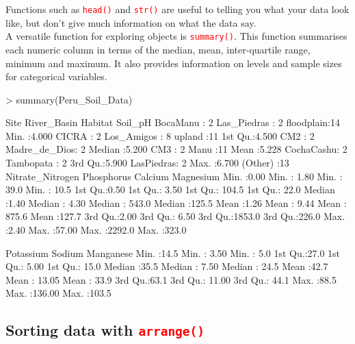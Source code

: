 \documentclass[a4paper,12pt]{article}
\newcommand\code[1]{\textcolor{red}{\texttt{#1}}}
\begin{document}
Functions such as \code{head()} and \code{str()} are useful to telling you what your data look like, but don't give much information on what the data say.\\

A versatile function for exploring objects is \code{summary()}. This function summarises each numeric column in terms of the median, mean, inter-quartile range, minimum and maximum. It also provides information on levels and sample sizes for categorical variables. 

\begin{shaded}
\begin{Schunk}
\begin{Sinput}
> summary(Peru_Soil_Data)
\end{Sinput}
\begin{Soutput}
         Site           River_Basin       Habitat      Soil_pH     
 BocaManu  : 2   Las_Piedras  : 2   floodplain:14   Min.   :4.000  
 CICRA     : 2   Los_Amigos   : 8   upland    :11   1st Qu.:4.500  
 CM2       : 2   Madre_de_Dios: 2                   Median :5.200  
 CM3       : 2   Manu         :11                   Mean   :5.228  
 CochaCashu: 2   Tambopata    : 2                   3rd Qu.:5.900  
 LasPiedras: 2                                      Max.   :6.700  
 (Other)   :13                                                     
 Nitrate_Nitrogen   Phosphorus       Calcium         Magnesium    
 Min.   :0.00     Min.   : 1.80   Min.   :  39.0   Min.   : 10.5  
 1st Qu.:0.50     1st Qu.: 3.50   1st Qu.: 104.5   1st Qu.: 22.0  
 Median :1.40     Median : 4.30   Median : 543.0   Median :125.5  
 Mean   :1.26     Mean   : 9.44   Mean   : 875.6   Mean   :127.7  
 3rd Qu.:2.00     3rd Qu.: 6.50   3rd Qu.:1853.0   3rd Qu.:226.0  
 Max.   :2.40     Max.   :57.00   Max.   :2292.0   Max.   :323.0  
                                                                  
   Potassium        Sodium         Manganese    
 Min.   :14.5   Min.   :  3.50   Min.   :  5.0  
 1st Qu.:27.0   1st Qu.:  5.00   1st Qu.: 15.0  
 Median :35.5   Median :  7.50   Median : 24.5  
 Mean   :42.7   Mean   : 13.05   Mean   : 33.9  
 3rd Qu.:63.1   3rd Qu.: 11.00   3rd Qu.: 44.1  
 Max.   :88.5   Max.   :136.00   Max.   :103.5  
\end{Soutput}
\end{Schunk}
\end{shaded}

\subsection{Sorting data with \code{arrange()}}
\end{document}
